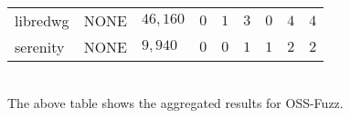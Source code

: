 \begin{adjustbox}{width=\textwidth,center}
\begin{tabular}{|l|l|l|l|l|l|l|l|l|}
libredwg         & NONE                & $46,160$            & $0$              & $1$           & $3$           & $0$            & $4$             & $4$                 \\
serenity         & NONE                & $9,940$             & $0$              & $0$           & $1$           & $1$            & $2$             & $2$                 \\
\hline
\end{tabular}
\end{adjustbox}{}
\ \\ \newline
The above table shows the aggregated results for OSS-Fuzz.
\newline \newline


\newpage
{}


